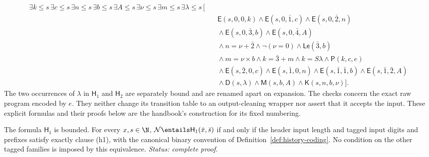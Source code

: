 \begin{definition}
\[\begin{aligned}
  \exists k\leq s\,\exists c\leq s\,\exists n\leq s\,
  \exists b\leq s\,\exists A\leq s\,\exists\nu\leq s\,
  \exists m\leq s\,\exists\lambda\leq s\,\bigl[\\
 &\quad\mathsf E(s,0,0,k)\land\mathsf E(s,0,\bar1,c)
        \land\mathsf E(s,0,\bar2,n)\\
 &\quad\land\mathsf E(s,0,\bar3,b)
        \land\mathsf E(s,0,\bar4,A)\\
 &\quad\land n=\nu+\bar2\land\neg(\nu=0)
        \land\mathsf{Le}(\bar3,b)\\
 &\quad\land m=\nu\times b\land k=\bar3+m
        \land k=S\lambda\land\mathsf P(k,c,e)\\
 &\quad\land\mathsf E(s,\bar2,0,c)
        \land\mathsf E(s,\bar1,0,n)
        \land\mathsf E(s,\bar1,\bar1,b)
        \land\mathsf E(s,\bar1,\bar2,A)\\
 &\quad\land\mathsf D(s,\lambda)
        \land\mathsf M(s,b,A)\land\mathsf K(s,n,b,\nu)\bigr].
\end{aligned}
\]
The two occurrences of \(\lambda\) in \(\mathsf H_1\) and
\(\mathsf H_2\) are separately bound and are renamed apart on
expansion.  The checks concern the exact raw program encoded by \(e\).
They neither change its transition table to an output-cleaning wrapper
nor assert that it accepts the input.  These explicit formulas and their
proofs below are the handbook's construction for its fixed numbering.
\end{definition}

\begin{lemma}
\label{lem:p04-input-formula}
The formula \(\mathsf H_1\) is bounded.  For every \(x,s\in\N\),
\(\mathcal N\entails\mathsf H_1(\bar x,\bar s)\) if and only if
the header input length and tagged input digits and prefixes satisfy
exactly clause (h1), with the canonical binary convention of
Definition~\ref{def:history-coding}.  No condition on the other tagged
families is imposed by this equivalence.
\textit{Status: complete proof.}
\end{lemma}

